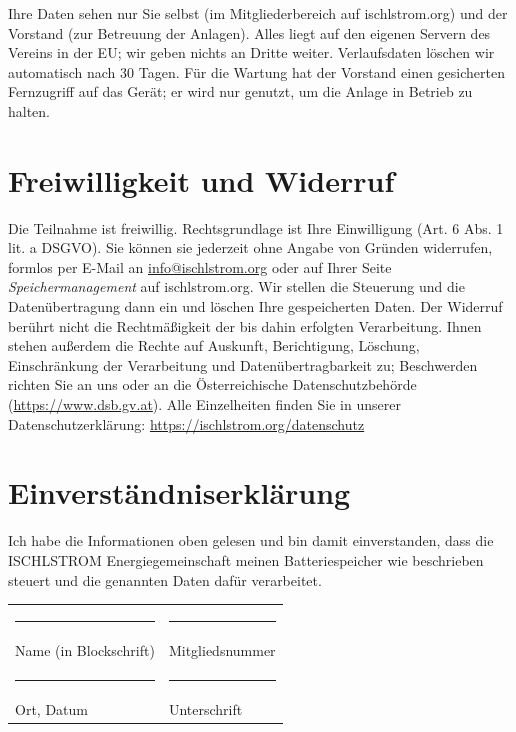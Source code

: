 \documentclass[a4paper,10pt]{article}
\begin{document}
Ihre Daten sehen nur Sie selbst (im Mitgliederbereich auf ischlstrom.org)
und der Vorstand (zur Betreuung der Anlagen). Alles liegt auf den eigenen
Servern des Vereins in der EU; wir geben nichts an Dritte weiter.
Verlaufsdaten löschen wir automatisch nach 30 Tagen. Für die Wartung hat
der Vorstand einen gesicherten Fernzugriff auf das Gerät; er wird nur
genutzt, um die Anlage in Betrieb zu halten.

\section*{Freiwilligkeit und Widerruf}

Die Teilnahme ist freiwillig. Rechtsgrundlage ist Ihre Einwilligung
(Art. 6 Abs. 1 lit. a DSGVO). Sie können sie jederzeit ohne Angabe von
Gründen widerrufen, formlos per E-Mail an
\href{mailto:info@ischlstrom.org}{info@ischlstrom.org} oder auf Ihrer
Seite \emph{Speichermanagement} auf ischlstrom.org. Wir stellen die
Steuerung und die Datenübertragung dann ein und löschen Ihre gespeicherten
Daten. Der Widerruf berührt nicht die Rechtmäßigkeit der bis dahin
erfolgten Verarbeitung. Ihnen stehen außerdem die Rechte auf Auskunft,
Berichtigung, Löschung, Einschränkung der Verarbeitung und
Datenübertragbarkeit zu; Beschwerden richten Sie an uns oder an die
Österreichische Datenschutzbehörde (\url{https://www.dsb.gv.at}). Alle
Einzelheiten finden Sie in unserer Datenschutzerklärung:
\url{https://ischlstrom.org/datenschutz}

\section*{Einverständniserklärung}

Ich habe die Informationen oben gelesen und bin damit einverstanden, dass
die ISCHLSTROM Energiegemeinschaft meinen Batteriespeicher wie beschrieben
steuert und die genannten Daten dafür verarbeitet.

\vspace{2em}
\noindent
\begin{tabular}{@{}p{}p{}@{}}
    \rule{0.4\textwidth}{0.4pt} & \rule{0.4\textwidth}{0.4pt}\\
    Name (in Blockschrift) & Mitgliedsnummer\\[2em]
    \rule{0.4\textwidth}{0.4pt} & \rule{0.4\textwidth}{0.4pt}\\
    Ort, Datum & Unterschrift\\
\end{tabular}
\end{document}
